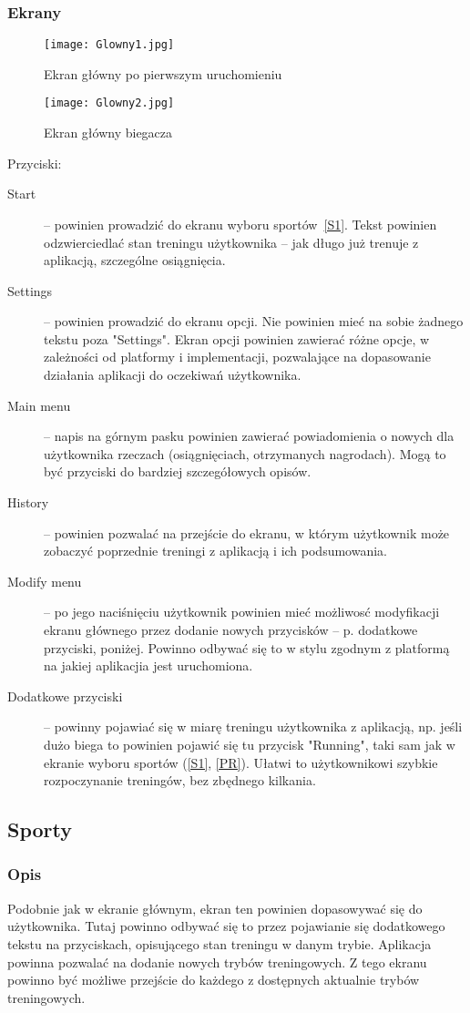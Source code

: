 \subsubsection{Ekrany}
\begin{figure}[b!]
  \texttt{[image: Glowny1.jpg]}
  \caption{Ekran główny po pierwszym uruchomieniu}
  \label{G1}
\end{figure}
\begin{figure}[b!]
  \texttt{[image: Glowny2.jpg]}
  \caption{Ekran główny biegacza}
  \label{G2}
\end{figure}
Przyciski:\\
\begin{description}
  \item[Start] -- powinien prowadzić do ekranu wyboru sportów~\ref{S1}. Tekst powinien odzwierciedlać stan treningu użytkownika -- jak długo już trenuje z aplikacją, szczególne osiągnięcia.
  \item[Settings] -- powinien prowadzić do ekranu opcji. Nie powinien mieć na sobie żadnego tekstu poza "Settings". Ekran opcji powinien zawierać różne opcje, w zależności od platformy i implementacji, pozwalające na dopasowanie działania aplikacji do oczekiwań użytkownika.
  \item[Main menu] -- napis na górnym pasku powinien zawierać powiadomienia o nowych dla użytkownika rzeczach (osiągnięciach, otrzymanych nagrodach). Mogą to być przyciski do bardziej szczegółowych opisów.
  \item[History] -- powinien pozwalać na przejście do ekranu, w którym użytkownik może zobaczyć poprzednie treningi z aplikacją i ich podsumowania.
  \item[Modify menu] -- po jego naciśnięciu użytkownik powinien mieć możliwosć modyfikacji ekranu głównego przez dodanie nowych przycisków -- p. dodatkowe przyciski, poniżej. Powinno odbywać się to w stylu zgodnym z platformą na jakiej aplikacjia jest uruchomiona.
  \item[Dodatkowe przyciski] -- powinny pojawiać się w miarę treningu użytkownika z aplikacją, np. jeśli dużo biega to powinien pojawić się tu przycisk "Running", taki sam jak w ekranie wyboru sportów (\ref{S1}, \ref{PR}). Ułatwi to użytkownikowi szybkie rozpoczynanie treningów, bez zbędnego kilkania.
\end{description}
\subsection{Sporty}
\subsubsection{Opis}
\noindent Podobnie jak w ekranie głównym, ekran ten powinien dopasowywać się do użytkownika. Tutaj powinno odbywać się to przez pojawianie się dodatkowego tekstu na przyciskach, opisującego stan treningu w danym trybie. Aplikacja powinna pozwalać na dodanie nowych trybów treningowych. Z tego ekranu powinno być możliwe przejście do każdego z dostępnych aktualnie trybów treningowych.
